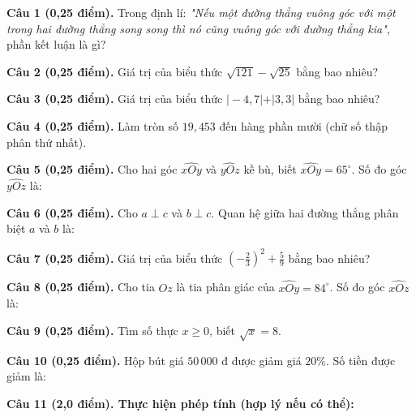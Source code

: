 \documentclass[12pt,a4paper]{article}
\begin{document}
\noindent\textbf{Câu 1 (0,25 điểm).} Trong định lí: \textit{"Nếu một đường thẳng vuông góc với một trong hai đường thẳng song song thì nó cũng vuông góc với đường thẳng kia"}, phần kết luận là gì? \par\vspace{0.35mm}
\noindent\textbf{Câu 2 (0,25 điểm).} Giá trị của biểu thức $\sqrt{121} - \sqrt{25}$ bằng bao nhiêu? \par\vspace{0.35mm}
\noindent\textbf{Câu 3 (0,25 điểm).} Giá trị của biểu thức $\vert -4{,}7\vert + \vert 3{,}3\vert$ bằng bao nhiêu? \par\vspace{0.35mm}
\noindent\textbf{Câu 4 (0,25 điểm).} Làm tròn số $19{,}453$ đến hàng phần mười (chữ số thập phân thứ nhất). \par\vspace{0.35mm}
\noindent\textbf{Câu 5 (0,25 điểm).} Cho hai góc $\widehat{xOy}$ và $\widehat{yOz}$ kề bù, biết $\widehat{xOy} = 65^\circ$. Số đo góc $\widehat{yOz}$ là: \par\vspace{0.35mm}
\noindent\textbf{Câu 6 (0,25 điểm).} Cho $a \perp c$ và $b \perp c$. Quan hệ giữa hai đường thẳng phân biệt $a$ và $b$ là: \par\vspace{0.35mm}
\noindent\textbf{Câu 7 (0,25 điểm).} Giá trị của biểu thức $\left(-\frac{2}{3}\right)^2 + \frac{5}{9}$ bằng bao nhiêu? \par\vspace{0.35mm}
\noindent\textbf{Câu 8 (0,25 điểm).} Cho tia $Oz$ là tia phân giác của $\widehat{xOy} = 84^\circ$. Số đo góc $\widehat{xOz}$ là: \par\vspace{0.35mm}
\noindent\textbf{Câu 9 (0,25 điểm).} Tìm số thực $x \ge 0$, biết $\sqrt{x} = 8$. \par\vspace{0.35mm}
\noindent\textbf{Câu 10 (0,25 điểm).} Hộp bút giá $50\,000$ đ được giảm giá $20\%$. Số tiền được giảm là: \par\vspace{0.35mm}
\vspace{0.6mm}

\noindent\textbf{Câu 11 (2,0 điểm). Thực hiện phép tính (hợp lý nếu có thể):}
\vspace{0.6mm}
\end{document}
